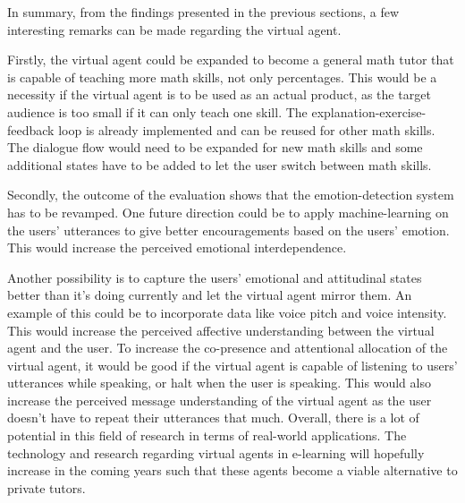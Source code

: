 In summary, from the findings presented in the previous sections, a few interesting remarks can be made regarding the virtual agent.

Firstly, the virtual agent could be expanded to become a general math tutor that is capable of teaching more math skills, not only percentages. This would be a necessity if the virtual agent is to be used as an actual product, as the target audience is too small if it can only teach one skill. The explanation-exercise-feedback loop is already implemented and can be reused for other math skills. The dialogue flow would need to be expanded for new math skills and some additional states have to be added to let the user switch between math skills.

Secondly, the outcome of the evaluation shows that the emotion-detection system has to be revamped. One future direction could be to apply machine-learning on the users' utterances to give better encouragements based on the users' emotion. This would increase the perceived emotional interdependence. 

Another possibility is to capture the users' emotional and attitudinal states better than it's doing currently and let the virtual agent mirror them. An example of this could be to incorporate data like voice pitch and voice intensity. This would increase the perceived affective understanding between the virtual agent and the user. To increase the co-presence and attentional allocation of the virtual agent, it would be good if the virtual agent is capable of listening to users' utterances while speaking, or halt when the user is speaking. This would also increase the perceived message understanding of the virtual agent as the user doesn't have to repeat their utterances that much.
Overall, there is a lot of potential in this field of research in terms of real-world applications. The technology and research regarding virtual agents in e-learning will hopefully increase in the coming years such that these agents become a viable alternative to private tutors.